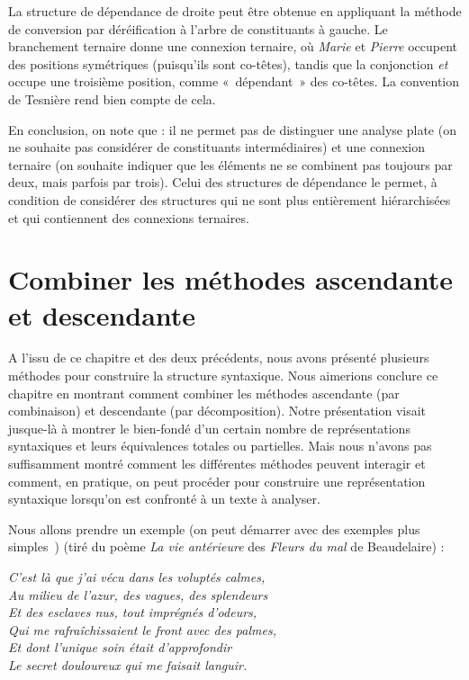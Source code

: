 {    La structure de dépendance de droite peut être obtenue en appliquant la méthode de conversion par déréification à l’arbre de constituants à gauche. Le branchement ternaire donne une connexion ternaire, où \textit{Marie} et \textit{Pierre} occupent des positions symétriques (puisqu’ils sont co-têtes), tandis que la conjonction \textit{et} occupe une troisième position, comme «~dépendant~» des co-têtes. La convention de Tesnière rend bien compte de cela.

    En conclusion, on note que : il ne permet pas de distinguer une analyse plate (on ne souhaite pas considérer de constituants intermédiaires) et une connexion ternaire (on souhaite indiquer que les éléments ne se combinent pas toujours par deux, mais parfois par trois). Celui des structures de dépendance le permet, à condition de considérer des structures qui ne sont plus entièrement hiérarchisées et qui contiennent des connexions ternaires.
}
\section{Combiner les méthodes ascendante et descendante}\label{sec:3.4.27}

A l’issu de ce chapitre et des deux précédents, nous avons présenté plusieurs méthodes pour construire la structure syntaxique. Nous aimerions conclure ce chapitre en montrant comment combiner les méthodes ascendante (par combinaison) et descendante (par décomposition). Notre présentation visait jusque-là à montrer le bien-fondé d’un certain nombre de représentations syntaxiques et leurs équivalences totales ou partielles. Mais nous n’avons pas suffisamment montré comment les différentes méthodes peuvent interagir et comment, en pratique, on peut procéder pour construire une représentation syntaxique lorsqu’on est confronté à un texte à analyser.


Nous allons prendre un exemple (on peut démarrer avec des exemples plus simples~\HappySmiley) (tiré du poème \textit{La vie antérieure} des \textit{Fleurs du mal} de Beaudelaire) :

\ea\label{ex:beaudelaire}
\itshape
C’est là que j’ai vécu dans les voluptés calmes,\\
Au milieu de l’azur, des vagues, des splendeurs\\
Et des esclaves nus, tout imprégnés d’odeurs,\\
Qui me rafraîchissaient le front avec des palmes,\\
Et dont l’unique soin était d’approfondir\\
Le secret douloureux qui me faisait languir.
\z

